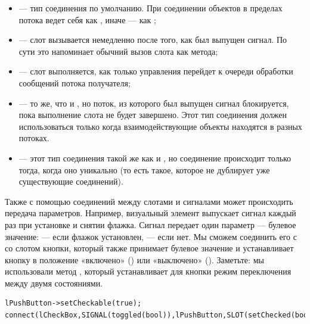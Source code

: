 \begin{itemize}
\item {} --- тип соединения по умолчанию. При соединении объектов в пределах потока ведет
себя как , иначе --- как ;
\item {} --- слот вызывается немедленно после того, как был выпущен сигнал. По сути это
напоминает обычний вызов слота как метода;
\item {} --- слот выполняется, как только управления перейдет к очереди обработки
сообщений потока получателя;
\item {} --- то же, что и , но поток, из которого был
выпущен сигнал блокируется, пока выполнение слота не будет завершено. Этот тип соединения должен использоваться только
когда взаимодействующие объекты находятся в разных потоках.
\item {} --- этот тип соединения такой же как и , но
соединение происходит только тогда, когда оно уникально (то есть такое, которое не дублирует уже существующие
соединений).
\end{itemize}
Также с помощью соединений между слотами и сигналами может происходить передача параметров. Например, визуальный элемент
 выпускает сигнал  каждый раз при установке и снятии флажка.
Сигнал  передает один параметр --- булевое значение:  --- если флажок установлен, 
 --- если нет.
Мы сможем соединить его с со слотом  кнопки, который также принимает булевое значение и
устанавливает кнопку в положение «включено» () или «выключено» (). Заметьте: мы использовали метод
, который устанавливает для кнопки режим переключения между двумя состояниями.
\begin{lstlisting}
lPushButton->setCheckable(true);
connect(lCheckBox,SIGNAL(toggled(bool)),lPushButton,SLOT(setChecked(bool)));
\end{lstlisting}


